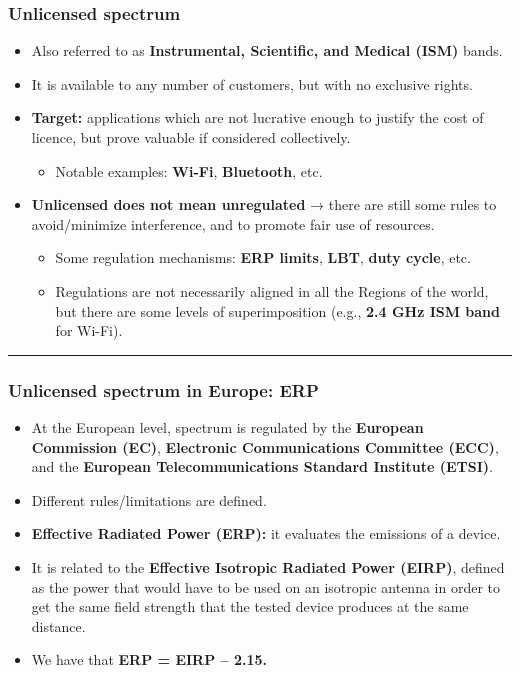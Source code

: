 \documentclass[a4paper, 12pt]{book} %
\begin{document}
\subsubsection{Unlicensed spectrum}\label{unlicensed-spectrum}

\begin{itemize}
\tightlist
\item
  Also referred to as \textbf{Instrumental, Scientific, and Medical
  (ISM)} bands.
\item
  It is available to any number of customers, but with no exclusive
  rights.
\item
  \textbf{Target:} applications which are not lucrative enough to
  justify the cost of licence, but prove valuable if considered
  collectively.

  \begin{itemize}
  \tightlist
  \item
    Notable examples: \textbf{Wi-Fi}, \textbf{Bluetooth}, etc.
  \end{itemize}
\item
  \textbf{Unlicensed does not mean unregulated} → there are still some
  rules to avoid/minimize interference, and to promote fair use of
  resources.

  \begin{itemize}
  \tightlist
  \item
    Some regulation mechanisms: \textbf{ERP limits}, \textbf{LBT},
    \textbf{duty cycle}, etc.
  \item
    Regulations are not necessarily aligned in all the Regions of the
    world, but there are some levels of superimposition (e.g.,
    \textbf{2.4 GHz ISM band} for Wi-Fi).
  \end{itemize}
\end{itemize}

\begin{center}\rule{0.5\linewidth}{0.5pt}\end{center}

\subsubsection{Unlicensed spectrum in Europe:
ERP}\label{unlicensed-spectrum-in-europe-erp}

\begin{itemize}
\tightlist
\item
  At the European level, spectrum is regulated by the \textbf{European
  Commission (EC)}, \textbf{Electronic Communications Committee (ECC)},
  and the \textbf{European Telecommunications Standard Institute
  (ETSI)}.
\item
  Different rules/limitations are defined.
\item
  \textbf{Effective Radiated Power (ERP):} it evaluates the emissions of
  a device.
\item
  It is related to the \textbf{Effective Isotropic Radiated Power
  (EIRP)}, defined as the power that would have to be used on an
  isotropic antenna in order to get the same field strength that the
  tested device produces at the same distance.
\item
  We have that \textbf{ERP = EIRP -- 2.15.}
\end{itemize}
\end{document}
